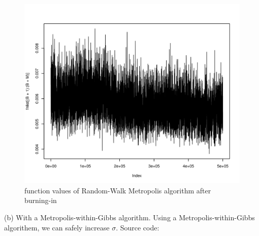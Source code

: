 \begin{figure}[H]
  \centering
\begin{knitrout}
\color{fgcolor}\begin{kframe}
\begin{alltt}
\hlstd{(fnlist[(B}\hlopt{+}\hlstd{)}\hlopt{:}\hlopt{+}\hlstd{M)],}\hlstd{=}\hlstd{)}
\end{alltt}
\end{kframe}
\includegraphics[width=\maxwidth]{figure/p9aplot-1} 

\end{knitrout}
		\caption{function values of Random-Walk Metropolis algorithm after burning-in}
\end{figure}
(b) With a Metropolis-within-Gibbs algorithm.
Using a Metropolis-within-Gibbs algorithem, we can safely increase $\sigma$. Source code:


